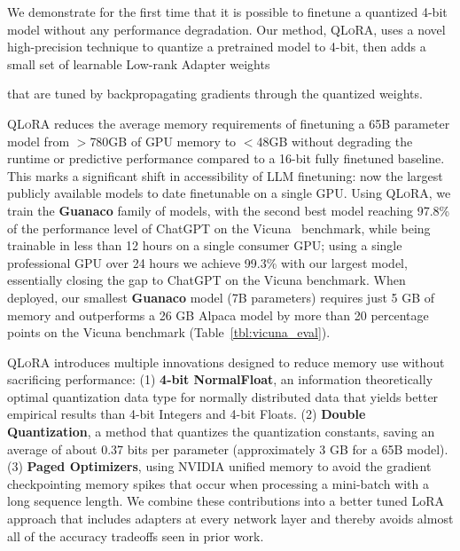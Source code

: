 We demonstrate for the first time that it is possible to finetune a quantized 4-bit model without any performance degradation. Our method, \textsc{QLoRA}, uses a novel high-precision technique to quantize a pretrained model to 4-bit, then adds a small set of learnable Low-rank Adapter weights \citep{hu2021lora} 

that are tuned by backpropagating gradients through the quantized weights. 

\textsc{QLoRA} reduces the average memory requirements of finetuning a 65B parameter model from $>$780GB of GPU memory to $<$48GB without degrading the runtime or predictive performance compared to a 16-bit fully finetuned baseline. This marks a significant shift in accessibility of LLM finetuning: now the largest publicly available models to date finetunable on a single GPU. Using \textsc{QLoRA}, we train the \textbf{Guanaco} family of models, with the second best model reaching 97.8\% of the performance level of ChatGPT on the Vicuna~\citep{vicuna2023} benchmark, while being trainable in less than 12 hours on a single consumer GPU; using a single professional GPU over 24 hours we achieve 99.3\% with our largest model, essentially closing the gap to ChatGPT on the Vicuna benchmark. When deployed, our smallest \textbf{Guanaco} model (7B parameters) requires just 5 GB of memory and outperforms a 26 GB Alpaca model by more than 20 percentage points on the Vicuna benchmark (Table~\ref{tbl:vicuna_eval}).

\textsc{QLoRA} introduces multiple innovations designed to reduce memory use without sacrificing performance: (1) \textbf{4-bit NormalFloat}, an information theoretically optimal quantization data type for normally distributed data that yields better empirical results than 4-bit Integers and 4-bit Floats. (2) \textbf{Double Quantization}, a method that quantizes the quantization constants, saving an average of about 0.37 bits per parameter (approximately 3 GB for a 65B model). (3) \textbf{Paged Optimizers}, using NVIDIA unified memory to avoid the gradient checkpointing memory spikes that occur when processing a mini-batch with a long sequence length. We combine these contributions into a better tuned LoRA approach that includes adapters at every network layer and thereby avoids almost all of the accuracy tradeoffs seen in prior work.

